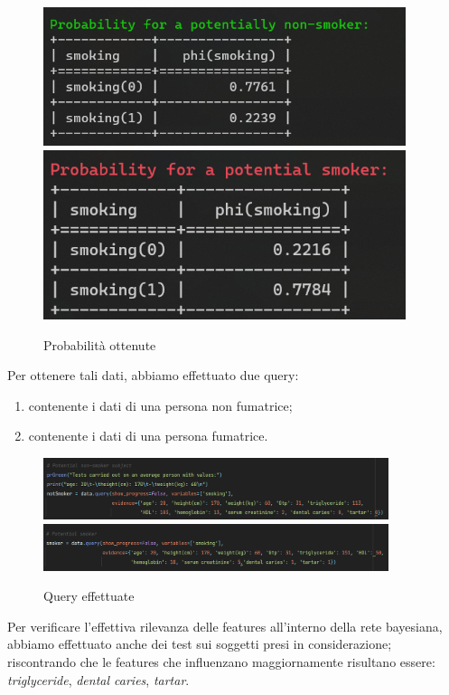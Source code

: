\documentclass{article}
\begin{document}
\begin{figure}[H]
        \includegraphics[width=10.6cm]{imagePNS}
        \includegraphics[width=10.6cm]{imagePS}
        \centering
        \caption{Probabilità ottenute}
        \centering
\end{figure}

Per ottenere tali dati, abbiamo effettuato due query:
\begin{enumerate}
    \item contenente i dati di una persona non fumatrice;
    \item contenente i dati di una persona fumatrice.
\end{enumerate}
\begin{figure}[H]
        \includegraphics[width=0.9\textwidth]{query1}
        \includegraphics[width=0.9\textwidth]{query2}
        \centering
        \caption{Query effettuate}
        \centering
\end{figure}
%

\noindent
Per verificare l'effettiva rilevanza delle features all'interno della rete bayesiana, abbiamo effettuato anche dei test sui soggetti presi in considerazione; riscontrando  che le features che influenzano maggiornamente risultano essere: \textit{triglyceride}, \textit{dental caries}, \textit{tartar}.   
%
\end{document}
